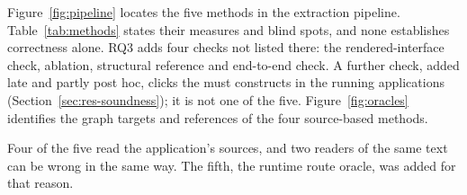 Figure~\ref{fig:pipeline} locates the five methods in the extraction pipeline.
Table~\ref{tab:methods} states their measures and blind spots, and none establishes correctness
alone. RQ3 adds four checks not listed there: the rendered-interface check, ablation, structural
reference and end-to-end check. A further check, added late and partly post hoc, clicks the must
constructs in the running applications (Section~\ref{sec:res-soundness}); it is not one of the five. Figure~\ref{fig:oracles} identifies the graph targets and
references of the four source-based methods.



Four of the five read the application's sources, and two readers of the same text can be wrong in
the same way. The fifth, the runtime route oracle, was added for that reason.



